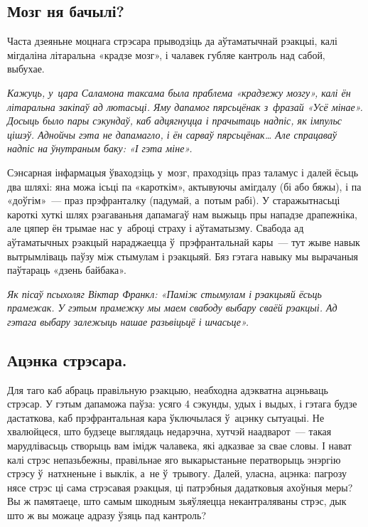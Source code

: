 \subsection*{Мозг ня бачылі?}

Часта дзеяньне моцнага стрэсара прыводзіць да аўтаматычнай рэакцыі, калі мігдаліна літаральна «крадзе мозг», і чалавек губляе кантроль над сабой, выбухае.

\emph{Кажуць, у~цара Саламона таксама была праблема «крадзежу мозгу», калі ён літаральна закіпаў ад лютасьці. Яму дапамог пярсьцёнак з~фразай «Усё мінае». Досыць было пары сэкундаў, каб адцягнуцца і прачытаць надпіс, як імпульс цішэў. Аднойчы гэта не дапамагло, і ён сарваў пярсьцёнак… Але спрацаваў надпіс на ўнутраным баку: «І гэта міне».}

Сэнсарная інфармацыя ўваходзіць у~мозг, праходзіць праз таламус і далей ёсьць два шляхі: яна можа ісьці па «кароткім», актывуючы амігдалу (бі або бяжы), і па «доўгім»~--- праз прэфранталку (падумай, а~потым рабі). У старажытнасьці кароткі хуткі шлях рэагаваньня дапамагаў нам выжыць пры нападзе драпежніка, але цяпер ён трымае нас у~аброці страху і аўтаматызму. Свабода ад аўтаматычных рэакцый нараджаецца ў~прэфрантальнай кары~--- тут жыве навык вытрымліваць паўзу між стымулам і рэакцыяй. Бяз гэтага навыку мы вырачаныя паўтараць «дзень байбака».

\emph{Як пісаў псыхоляг Віктар Франкл: «Паміж стымулам і рэакцыяй ёсьць прамежак. У гэтым прамежку мы маем свабоду выбару сваёй рэакцыі. Ад гэтага выбару залежыць нашае разьвіцьцё і шчасьце».}

\subsection*{Ацэнка стрэсара.}

Для таго каб абраць правільную рэакцыю, неабходна адэкватна ацэньваць стрэсар. У гэтым дапаможа паўза: усяго 4 сэкунды, удых і выдых, і гэтага будзе дастаткова, каб прэфрантальная кара ўключылася ў~ацэнку сытуацыі. Не хвалюйцеся, што будзеце выглядаць недарэчна, хутчэй наадварот~--- такая марудлівасьць створыць вам імідж чалавека, які адказвае за свае словы. І нават калі стрэс непазьбежны, правільнае яго выкарыстаньне ператворыць энэргію стрэсу ў~натхненьне і выклік, а~не ў~трывогу. Далей, уласна, ацэнка: пагрозу нясе стрэс ці сама стрэсавая рэакцыя, ці патрэбныя дадатковыя ахоўныя меры? Вы ж памятаеце, што самым шкодным зьяўляецца некантраляваны стрэс, дык што ж вы можаце адразу ўзяць пад кантроль?

